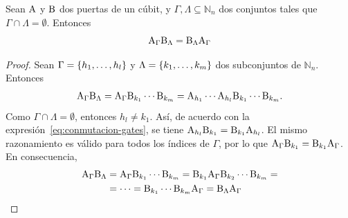 \begin{proposition}
  Sean $\text{A}$ y $\text{B}$ dos puertas de un cúbit, y $\Gamma, \Lambda \subseteq \mathbb{N}_n$ dos conjuntos tales que $\Gamma\cap\Lambda=\emptyset$.
  Entonces
  \begin{equation}
    \label{eq:conmutacion-sets}
    \text{A}_\Gamma\text{B}_{\Lambda} = \text{B}_{\Lambda}\text{A}_{\Gamma}
  \end{equation}
\end{proposition}
\begin{proof}
  Sean $\Gamma=\{h_1,\dots,h_l\}$ y $\Lambda=\{k_1,\dots,k_m\}$ dos subconjuntos de $\mathbb{N}_n$. Entonces
  \begin{align*}
    \text{A}_{\Gamma}\text{B}_{\Lambda}=\text{A}_{\Gamma}\text{B}_{k_1}\cdots\text{B}_{k_m}=\text{A}_{h_1}\cdots\text{A}_{h_l}\text{B}_{k_1}\cdots\text{B}_{k_m}.
  \end{align*}
  Como $\Gamma\cap\Lambda=\emptyset$, entonces $h_l\neq k_1$. Así, de acuerdo con la expresión~\eqref{eq:conmutacion-gates}, se tiene $\text{A}_{h_l}\text{B}_{k_1}=\text{B}_{k_1}\text{A}_{h_l}$.
  El mismo razonamiento es válido para todos los índices de $\Gamma$, por lo que $\text{A}_{\Gamma}\text{B}_{k_1}=\text{B}_{k_1}\text{A}_{\Gamma}$. En consecuencia,
  \begin{align*}
    \text{A}_{\Gamma}\text{B}_{\Lambda} & =\text{A}_{\Gamma}\text{B}_{k_1}\cdots\text{B}_{k_m}=\text{B}_{k_1}\text{A}_{\Gamma}\text{B}_{k_2}\cdots\text{B}_{k_m}= \\
                                        & =\dots = \text{B}_{k_1}\cdots\text{B}_{k_m}\text{A}_{\Gamma}=\text{B}_{\Lambda}\text{A}_{\Gamma}
  \end{align*}
\end{proof}

